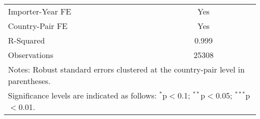 \begin{table}[htbp]
\begin{adjustbox}{max width=\textwidth}
\begin{tabular}{lcc}
    Importer-Year FE & Yes \\
    Country-Pair FE & Yes \\
    R-Squared & 0.999 \\
    Observations & 25308 \\
    \hline
    \multicolumn{3}{l}{\footnotesize{Notes: Robust standard errors clustered at the country-pair level in parentheses.}} \\
    \multicolumn{3}{l}{\footnotesize{Significance levels are indicated as follows: $^{\ast}$p$<$0.1; $^{\ast\ast}$p$<$0.05; $^{\ast\ast\ast}$p$<$0.01.}} \\
    \end{tabular}
    \end{adjustbox}
\end{table}

